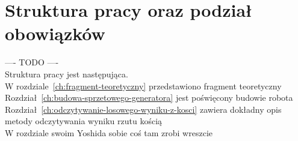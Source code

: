 \section{Struktura pracy oraz podział obowiązków}\label{sec:struktura-pracy-oraz-podzia-obowiazkow}

---- TODO ---- \\
Struktura pracy jest następująca. \\
W rozdziale~\ref{ch:fragment-teoretyczny} przedstawiono fragment teoretyczny\\
Rozdział~\ref{ch:budowa-sprzetowego-generatora} jest poświęcony budowie robota\\
Rozdział~\ref{ch:odczytywanie-losowego-wyniku-z-kosci} zawiera dokładny opis metody odczytywania wyniku rzutu kością \\
W rozdziale swoim Yoshida sobie coś tam zrobi wreszcie \\


